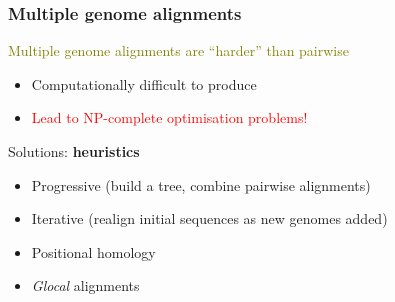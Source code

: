 
%
\begin{frame}
  \frametitle{Multiple genome alignments}
  \textcolor{olive}{Multiple genome alignments are ``harder'' than pairwise} \\
  \begin{itemize}
    \item Computationally difficult to produce
    \item \textcolor{red}{Lead to NP-complete optimisation problems!}
  \end{itemize}  
  \textcolor{hutton_green}{Solutions:} \textbf{heuristics}
  \begin{itemize}
    \item Progressive (build a tree, combine pairwise alignments)
    \item Iterative (realign initial sequences as new genomes added)
    \item \textcolor{hutton_blue}{Positional homology}
    \item \textcolor{hutton_purple}{\textit{Glocal} alignments}
  \end{itemize}  
\end{frame}

